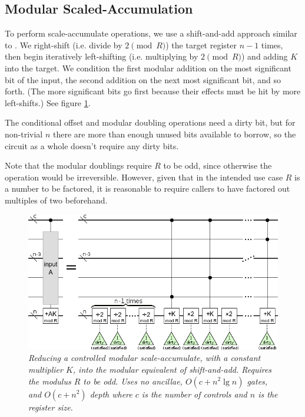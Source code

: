 \documentclass[twocolumn]{article}
\begin{document}
\subsection{Modular Scaled-Accumulation}

To perform scale-accumulate operations, we use a shift-and-add approach similar to \cite{beauregard2003}.
We right-shift (i.e. divide by $2 {\pmod R}$) the target register $n-1$ times, then begin iteratively left-shifting (i.e. multiplying by $2 {\pmod R}$) and adding $K$ into the target.
We condition the first modular addition on the most significant bit of the input, the second addition on the next most significant bit, and so forth.
(The more significant bits go first because their effects must be hit by more left-shifts.)
See figure \ref{fig:controlled-modular-scale-accumulate}.

The conditional offset and modular doubling operations need a dirty bit, but for non-trivial $n$ there are more than enough unused bits available to borrow, so the circuit as a whole doesn't require any dirty bits.

Note that the modular doublings require $R$ to be odd, since otherwise the operation would be irreversible.
However, given that in the intended use case $R$ is a number to be factored, it is reasonable to require callers to have factored out multiples of two beforehand.

\begin{figure}
  \centering
  \includegraphics[width=\linewidth]{assets/controlled-modular-multiply-accumulate.png}
  \caption{\em
    Reducing a controlled modular scale-accumulate, with a constant multiplier $K$, into the modular equivalent of shift-and-add.
    Requires the modulus $R$ to be odd.
    Uses no ancillae, $O(c + n^2 \lg n)$ gates, and $O(c + n^2)$ depth where $c$ is the number of controls and $n$ is the register size.
  }
  \label{fig:controlled-modular-scale-accumulate}
\end{figure}
\end{document}
